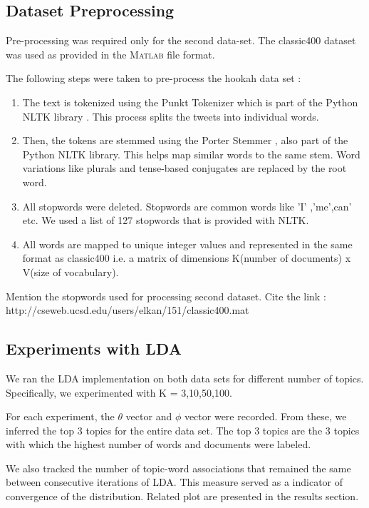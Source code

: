 \documentclass[11pt,a4paper,oneside]{article}
\begin{document}
\subsection{Dataset Preprocessing}
Pre-processing was required only for the second data-set. The classic400 dataset was used as provided in the \textsc{Matlab} file format.

The following steps were taken to pre-process the hookah data set : 

\begin{enumerate}
  \item The text is tokenized using the Punkt Tokenizer \cite{punkt} which is part of the Python NLTK library \cite{nltk}. This process splits the tweets into individual words.
  \item Then, the tokens are stemmed using the Porter Stemmer \cite{porter}, also part of the Python NLTK library. This helps map similar words to the same stem. Word variations like plurals and tense-based conjugates are replaced by the root word.
  \item All stopwords were deleted. Stopwords are common words like 'I' ,'me',can' etc. We used a list of 127 stopwords that is provided with NLTK\cite{nltk}.
  \item All words are mapped to unique integer values and represented in the same format as classic400 i.e. a matrix of dimensions K(number of documents) x V(size of vocabulary).
\end{enumerate}

Mention the stopwords used for processing second dataset.
Cite the link : http://cseweb.ucsd.edu/users/elkan/151/classic400.mat

\subsection{Experiments with LDA}
We ran the LDA implementation on both data sets for different number of topics. Specifically, we experimented with K = 3,10,50,100. 

For each experiment, the $\theta$ vector and $\phi$ vector were recorded. From these, we inferred the top 3 topics for the entire data set. The top 3 topics are the 3 topics with which the highest number of words and documents were labeled.

We also tracked the number of topic-word associations that remained the same between consecutive iterations of LDA. This measure served as a indicator of convergence of the distribution. Related plot are presented in the results section.
\end{document}
